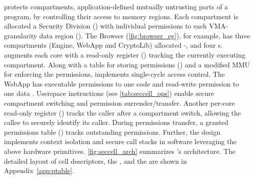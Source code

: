 \seccells protects compartments, application-defined mutually untrusting
parts of a program, by controlling their access to memory regions.
Each compartment is allocated a Security Division (\secdiv)
with individual permissions to each VMA-granularity data region (\cell{}).
The Browser (\autoref{fig:browser_eg}), for example, has 
three compartments (Engine, WebApp and CryptoLib) allocated 
-, and four \cell{}s.
\seccells augments each core with a read-only register (\sid) tracking 
the currently executing compartment.
Along with a table for storing permissions (\ptable) and a modified
MMU for enforcing the permissions, \seccells implements single-cycle
access control.
The WebApp \secdiv has executable permissions
to one code \cell and read-write permission to one data \cell.
Userspace instructions (see \autoref{tab:seccell_ops}) enable 
secure compartment switching and permission surrender/transfer.
%
Another per-core read-only register (\rid) tracks the caller after a 
compartment switch, allowing the callee to securely identify 
its caller.
During permissions transfer, a granted permissions table (\gtable) tracks
outstanding permissions.
Further, the design implements context isolation and secure call stacks
in software leveraging the above hardware primitives.
\autoref{fig:seccell_arch} summarizes \seccells's architecture.
The detailed layout of cell descriptors, the \ptable, and the \gtable 
are shown in Appendix~\ref{app:ptable}.


